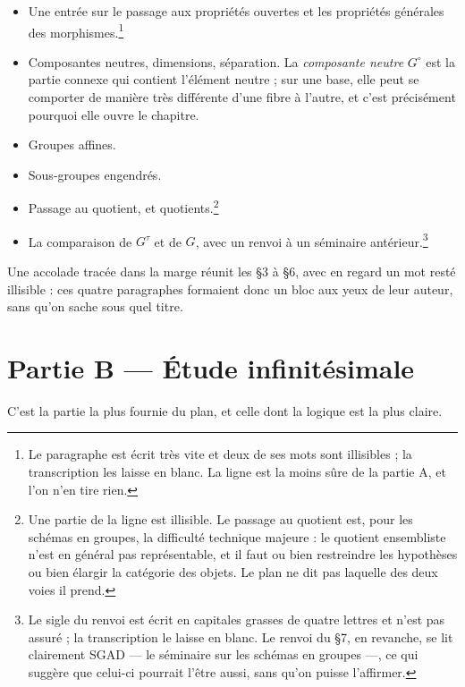 \documentclass[11pt,a4paper]{article}
\begin{document}
\begin{itemize}
\item[§1] Une entrée sur le passage aux propriétés ouvertes et les propriétés
générales des morphismes.\footnote{Le paragraphe est écrit très vite et deux de
ses mots sont illisibles ; la transcription les laisse en blanc. La ligne est
la moins sûre de la partie A, et l'on n'en tire rien.}

\item[§2] Composantes neutres, dimensions, séparation. La \emph{composante
neutre} $G^{\circ}$ est la partie connexe qui contient l'élément neutre ; sur
une base, elle peut se comporter de manière très différente d'une fibre à
l'autre, et c'est précisément pourquoi elle ouvre le chapitre.

\item[§3] Groupes affines.

\item[§4] Sous-groupes engendrés.

\item[§5] Passage au quotient, et quotients.\footnote{Une partie de la ligne
est illisible. Le passage au quotient est, pour les schémas en groupes, la
difficulté technique majeure : le quotient ensembliste n'est en général pas
représentable, et il faut ou bien restreindre les hypothèses ou bien élargir la
catégorie des objets. Le plan ne dit pas laquelle des deux voies il prend.}

\item[§6] La comparaison de $G^{\tau}$ et de $G$, avec un renvoi à un séminaire
antérieur.\footnote{Le sigle du renvoi est écrit en capitales grasses de quatre
lettres et n'est pas assuré ; la transcription le laisse en blanc. Le renvoi du
§7, en revanche, se lit clairement SGAD --- le séminaire sur les schémas en
groupes ---, ce qui suggère que celui-ci pourrait l'être aussi, sans qu'on
puisse l'affirmer.}
\end{itemize}

Une accolade tracée dans la marge réunit les §3 à §6, avec en regard un mot
resté illisible : ces quatre paragraphes formaient donc un bloc aux yeux de leur
auteur, sans qu'on sache sous quel titre.

\section*{Partie B --- Étude infinitésimale}

C'est la partie la plus fournie du plan, et celle dont la logique est la plus
claire.
\end{document}
